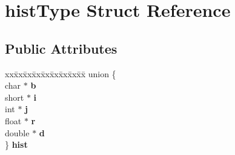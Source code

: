 \hypertarget{structhist_type}{}\section{hist\+Type Struct Reference}
\label{structhist_type}
\subsection*{Public Attributes}
\begin{DoxyCompactItemize}
\item 
\mbox{\label{structhist_type_a98d363c300043a56ef60f6460936e294}} 
\begin{tabbing}
xx\=xx\=xx\=xx\=xx\=xx\=xx\=xx\=xx\=\kill
union \{\\
\>char $\ast$ {\bfseries b}\\
\>short $\ast$ {\bfseries i}\\
\>int $\ast$ {\bfseries j}\\
\>float $\ast$ {\bfseries r}\\
\>double $\ast$ {\bfseries d}\\
\} {\bfseries hist}\\


\end{tabbing}
\end{DoxyCompactItemize}
